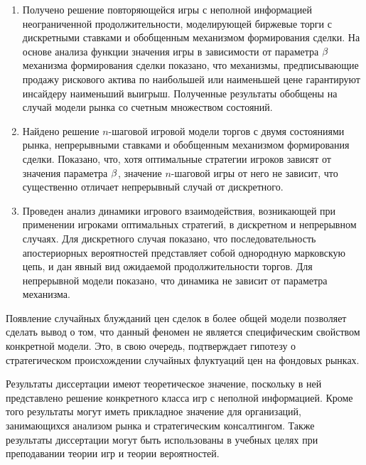 \begin{enumerate}
  \item
    Получено решение повторяющейся игры с неполной информацией неограниченной продолжительности, моделирующей биржевые торги с дискретными ставками и обобщенным механизмом формирования сделки.
    На основе анализа функции значения игры в зависимости от параметра $\beta$ механизма формирования сделки показано, что механизмы, предписывающие продажу рискового актива по наибольшей или наименьшей цене гарантируют инсайдеру наименьший выигрыш.
    Полученные результаты обобщены на случай модели рынка со счетным множеством состояний.
  \item
    Найдено решение $n$-шаговой игровой модели торгов с двумя состояниями рынка, непрерывными ставками и обобщенным механизмом формирования сделки.
    Показано, что, хотя оптимальные стратегии игроков зависят от значения параметра $\beta$, значение $n$-шаговой игры от него не зависит, что существенно отличает непрерывный случай от дискретного.
  \item
    Проведен анализ динамики игрового взаимодействия, возникающей при применении игроками оптимальных стратегий, в дискретном и непрерывном случаях.
    Для дискретного случая показано, что последовательность апостериорных вероятностей представляет собой однородную марковскую цепь, и дан явный вид ожидаемой продолжительности торгов.
    Для непрерывной модели показано, что динамика не зависит от параметра механизма.
\end{enumerate}

Появление случайных блужданий цен сделок в более общей модели позволяет сделать вывод о том, что данный феномен не является специфическим свойством конкретной модели.
Это, в свою очередь, подтверждает гипотезу о стратегическом происхождении случайных флуктуаций цен на фондовых рынках.

Результаты диссертации имеют теоретическое значение, поскольку в ней представлено решение конкретного класса игр с неполной информацией.
Кроме того результаты могут иметь прикладное значение для организаций, занимающихся анализом рынка и стратегическим консалтингом.
Также результаты диссертации могут быть использованы в учебных целях при преподавании теории игр и теории вероятностей.
\nocite{pyanykh:tikhon2014, pyanykh:lomonosov2016}

